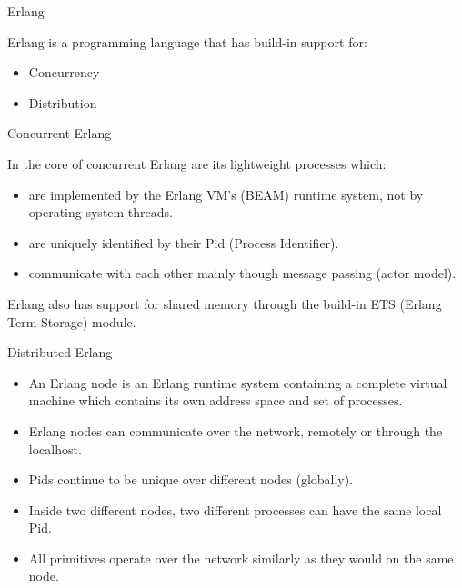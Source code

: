\begin{frame} {Erlang}

Erlang is a programming language that has build-in support for:

\begin{itemize}[<+->]
  \item Concurrency
  \item Distribution
\end{itemize}

\end{frame}
\begin{frame} {Concurrent Erlang}

In the core of concurrent Erlang are its lightweight processes which:

\begin{itemize}[<+->]
  \item are implemented by the Erlang VM's (BEAM) runtime system, not by operating system threads.
  \item are uniquely identified by their Pid (Process Identifier).
  \item communicate with each other mainly though message passing (actor model).

\end{itemize}
\pause

Erlang also has support for shared memory through the build-in ETS (Erlang Term Storage) module.

\end{frame}

\begin{frame} {Distributed Erlang}

\begin{itemize}[<+->]
\item An Erlang node is an Erlang runtime system containing a complete virtual machine which
contains its own address space and set of processes. 
\item Erlang nodes can communicate over the network, remotely or through the localhost. 
\item Pids continue to be unique over different
nodes (globally).
\item Inside two different nodes, two different processes can have the
same local Pid.
\item All primitives operate over the
network similarly as they would on the same node.

\end{itemize}

\end{frame}


